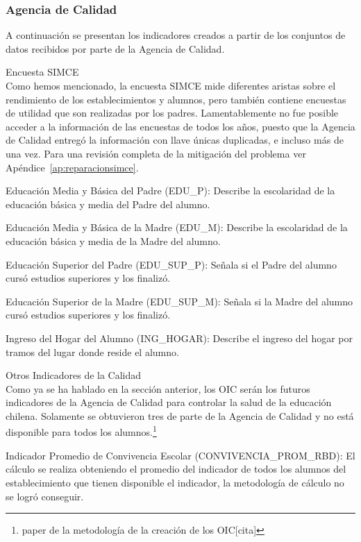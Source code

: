 \subsubsection{Agencia de Calidad}
A continuación se presentan los indicadores creados a partir de los conjuntos de datos recibidos por parte de la Agencia de Calidad.
\begin{longdescription}
  \item[Encuesta SIMCE] \hfill \\
    Como hemos mencionado, la encuesta SIMCE mide diferentes aristas sobre el rendimiento de los establecimientos y alumnos, pero también contiene encuestas de utilidad que son realizadas por los padres. Lamentablemente no fue posible acceder a la información de las encuestas de todos los años, puesto que la Agencia de Calidad entregó la información con llave únicas duplicadas, e incluso más de una vez. Para una revisión completa de la mitigación del problema ver Apéndice~\ref{ap:reparacionsimce}.
     \begin{longdescription}
        \item[Educación Media y Básica del Padre](EDU\_P): Describe la escolaridad de la educación básica y media del Padre del alumno.
        \item[Educación Media y Básica de la Madre](EDU\_M): Describe la escolaridad de la educación básica y media de la Madre del alumno.
        \item[Educación Superior del Padre](EDU\_SUP\_P): Señala si el Padre del alumno cursó estudios superiores y los finalizó.
        \item[Educación Superior de la Madre](EDU\_SUP\_M): Señala si la Madre del alumno cursó estudios superiores y los finalizó.
        \item[Ingreso del Hogar del Alumno](ING\_HOGAR): Describe el ingreso del hogar por tramos del lugar donde reside el alumno.
     \end{longdescription}
  \item[Otros Indicadores de la Calidad] \hfill \\
    Como ya se ha hablado en la sección anterior, los OIC serán los futuros indicadores de la Agencia de Calidad para controlar la salud de la educación chilena. Solamente se obtuvieron tres de parte de la Agencia de Calidad y no está disponible para todos los alumnos.\footnote{paper de la metodología de la creación de los OIC[cita]}
       \begin{longdescription}
        \item[Indicador Promedio de Convivencia Escolar](CONVIVENCIA\_PROM\_RBD): El cálculo se realiza obteniendo el promedio del indicador de todos los alumnos del establecimiento que tienen disponible el indicador, la metodología de cálculo no se logró conseguir.

\end{longdescription}
\end{longdescription}
